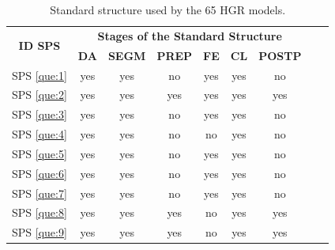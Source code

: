 \documentclass[sensors,review,accept,moreauthors,pdftex]{Definitions/mdpi}
\begin{document}
\begin{table}[H]
\centering
	\caption{Standard structure used by the 65 HGR models.} \label{tab:7}
	
	\begin{tabular}{ccccccccc}

	\toprule
	\multirow{2}{*}{\textbf{ID SPS}\vspace{-5pt}}&\multicolumn{6}{c}{\textbf{Stages of the Standard Structure}}\\ \cmidrule{2-7}
	
	
	
	&\textbf{DA}&\textbf{SEGM}&\textbf{PREP}&\textbf{FE}&\textbf{CL} &\textbf{POSTP}\\
\midrule
	
	
	
%	
%	
%	
%	
%	
%
%	
%	
%	



		SPS \ref{que:1}& yes  & yes& no& yes& yes& no\\
		
		SPS \ref{que:2}& yes & yes& yes& yes& yes& yes\\
		
		SPS \ref{que:3}& yes & yes& no& yes& yes& no\\
		
		SPS \ref{que:4}& yes & yes& no& no& yes& no\\
		
		SPS \ref{que:5}& yes & yes& no& yes& yes& no\\
		
		SPS \ref{que:6}& yes & yes& no& yes& yes& no\\
		
		SPS \ref{que:7}& yes & yes& no& yes& yes& no\\
		
		SPS \ref{que:8}& yes & yes& yes& no& yes& yes\\
		
		SPS \ref{que:9}& yes & yes& yes& no& yes& yes\\
		

\end{tabular}
\end{table}
\end{document}
